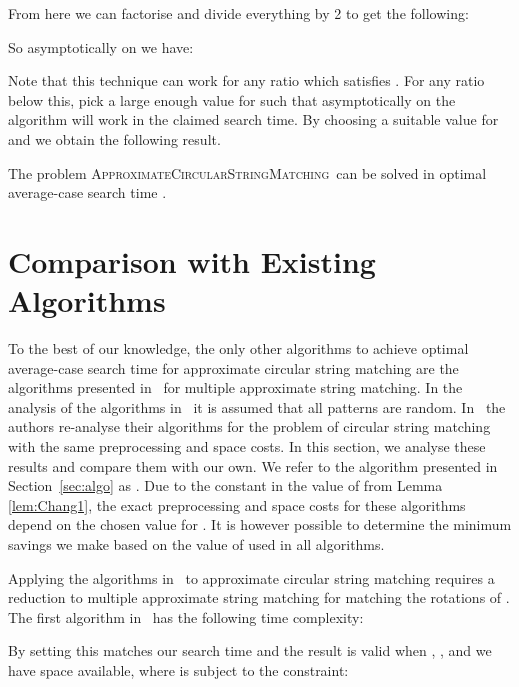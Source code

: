 \documentclass[runningheads, envcountsame, a4paper]{llncs}\usepackage{etex}
\newcommand{\ACSM}{\textsc{ApproximateCircularStringMatching}}
\begin{document}
\noindent From here we can factorise and divide everything by 2 to get the following:



\noindent So asymptotically on  we have:



\noindent Note that this technique can work for any ratio which satisfies .
For any ratio below this, pick a large enough value for  such that asymptotically on  the algorithm will work in the claimed search time.
By choosing a suitable value for  and  we obtain the following result.


\begin{theorem}
The problem \ACSM\ can be solved in optimal average-case search time .
\end{theorem}

\section{Comparison with Existing Algorithms}

To the best of our knowledge, the only other algorithms to achieve optimal average-case search time for approximate circular string matching are the algorithms presented in~\cite{Fredriksson:2004:ASM:1005813.1041513} for multiple approximate string matching. In the analysis of the algorithms in~\cite{Fredriksson:2004:ASM:1005813.1041513} it is assumed that all patterns are random. In~\cite{doi:10.1142/S0129054106004455} the authors re-analyse their algorithms for the problem of circular string matching with the same preprocessing and space costs. 
In this section, we analyse these results and compare them with our own. 
We refer to the algorithm presented in Section~\ref{sec:algo} as . Due to the constant  in the value of  from Lemma \ref{lem:Chang1}, the exact preprocessing and space costs for these algorithms depend on the chosen value for . It is however possible to determine the minimum savings we make based on the value of  used in all algorithms.

Applying the algorithms in~\cite{Fredriksson:2004:ASM:1005813.1041513} to approximate circular string matching requires a reduction to multiple approximate string matching for matching the  rotations of . The first algorithm in~\cite{Fredriksson:2004:ASM:1005813.1041513} has the following time complexity:



\noindent By setting  this matches our search time and the result is valid when , , and we have  space available, where  is subject to the constraint: 
\end{document}
